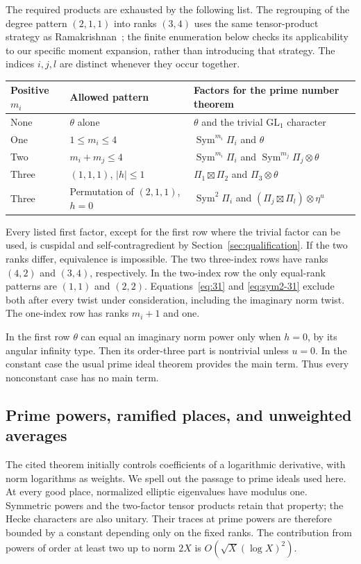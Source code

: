 \documentclass[11pt]{article}
\theoremstyle{definition}\newtheorem{definition}[theorem]{Definition}
\newcommand{\Sym}{\operatorname{Sym}}
\begin{document}
The required products are exhausted by the following list.
The regrouping of the degree pattern $(2,1,1)$ into ranks $(3,4)$
uses the same tensor-product strategy as
Ramakrishnan~\cite[Theorem 4.2.1, pp.~93--94]{ramakrishnan};
the finite enumeration below checks its applicability to our
specific moment expansion, rather than introducing that strategy.
The indices $i,j,l$ are distinct whenever they occur together.
\begin{center}\small
\begin{tabular}{P{20mm}P{40mm}P{78mm}}
\toprule
Positive $m_i$&Allowed pattern&Factors for the prime number theorem\\
\midrule
None&$\theta$ alone&$\theta$ and the trivial $\mathrm{GL}_1$ character\\
One&$1\le m_i\le4$&$\Sym^{m_i}\Pi_i$ and $\theta$\\
Two&$m_i+m_j\le4$&$\Sym^{m_i}\Pi_i$ and $\Sym^{m_j}\Pi_j\otimes\theta$\\
Three&$(1,1,1)$, $|h|\le1$&
 $\Pi_1\boxtimes\Pi_2$ and $\Pi_3\otimes\theta$\\
Three&Permutation of $(2,1,1)$, $h=0$&
 $\Sym^2\Pi_i$ and $(\Pi_j\boxtimes\Pi_l)\otimes\eta^u$\\
\bottomrule
\end{tabular}
\end{center}
Every listed first factor, except for the first row
where the trivial factor can be used, is cuspidal
and self-contragredient by Section~\ref{sec:qualification}.
If the two ranks differ, equivalence is impossible.
The two three-index rows have ranks $(4,2)$ and
$(3,4)$, respectively. In the two-index row the only
equal-rank patterns are $(1,1)$ and $(2,2)$.
Equations~\eqref{eq:31} and \eqref{eq:sym2-31}
exclude both after every twist under consideration,
including the imaginary norm twist.
The one-index row has ranks $m_i+1$ and one.

In the first row $\theta$ can equal an imaginary norm
power only when $h=0$, by its angular infinity type.
Then its order-three part is nontrivial unless $u=0$.
In the constant case the usual prime ideal theorem
provides the main term. Thus every nonconstant
case has no main term.

\subsection{Prime powers, ramified places, and unweighted averages}
The cited theorem initially controls coefficients of a
logarithmic derivative, with norm logarithms as weights.
We spell out the passage to prime ideals used here.
At every good place, normalized elliptic eigenvalues
have modulus one. Symmetric powers and the two-factor
tensor products retain that property; the Hecke
characters are also unitary. Their traces at prime
powers are therefore bounded by a constant depending
only on the fixed ranks.
The contribution from powers of order at least two up
to norm $2X$ is $O(\sqrt X(\log X)^2)$.
\end{document}

